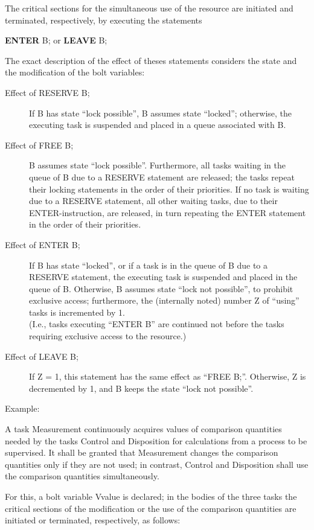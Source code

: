 \begin{tobedone}
The critical sections for the simultaneous use of the resource are
initiated and terminated, respectively, by executing the statements

{\bf ENTER} B; or {\bf LEAVE} B;

The exact description of the effect of theses statements considers the
state and the modification of the bolt variables:
\begin{description}
\item[Effect of RESERVE B;]
If B has state ``lock possible'', B assumes state ``locked''; otherwise,
the executing task is suspended and placed in a queue associated with B.
\item[Effect of FREE B;]
B assumes state ``lock possible''. Furthermore, all tasks waiting in the
queue of B due to a RESERVE statement are released; the tasks repeat
their locking statements in the order of their priorities. If no task
is waiting due to a RESERVE statement, all other waiting tasks, due to 
their ENTER-instruction, are released, in turn repeating the ENTER 
statement in the order of their priorities.
\item[Effect of ENTER B;]
If B has state ``locked'', or if a task is in the queue of B due to a
RESERVE statement, the executing task is suspended and placed in the
queue of B. Otherwise, B assumes state ``lock not possible'', to prohibit
exclusive access; furthermore, the (internally noted) number Z of
``using'' tasks is incremented by 1.\\
(I.e., tasks executing ``ENTER B'' are continued not before the tasks
requiring exclusive access to the resource.)
\item[Effect of LEAVE B;]
If Z = 1, this statement has the same effect as ``FREE B;''.
Otherwise, Z is decremented by 1, and B keeps the state ``lock not
possible''.
\end{description}

Example:

A task Measurement continuously acquires values of comparison
quantities needed by the tasks Control and Disposition for
calculations from a process to be supervised. It shall be granted that
Measurement changes the comparison quantities only if they are not
used; in contrast, Control and Disposition shall use the
comparison quantities simultaneously.

For this, a bolt variable Vvalue is declared; in the bodies of the three
tasks the critical sections of the modification or the use of the
comparison quantities are initiated or terminated, respectively, as
follows:


\end{tobedone}
